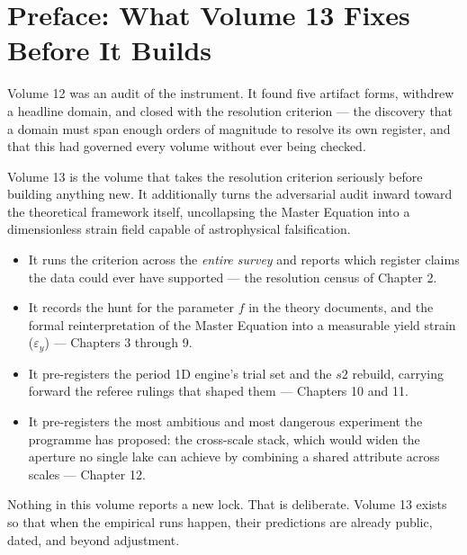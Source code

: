 \documentclass[11pt, letterpaper, openany]{book}
\begin{document}
\tableofcontents
\clearpage

\chapter*{Preface: What Volume 13 Fixes Before It Builds}

Volume 12 was an audit of the instrument. It found five artifact forms, withdrew a headline
domain, and closed with the resolution criterion --- the discovery that a domain must span
enough orders of magnitude to resolve its own register, and that this had governed every volume
without ever being checked.

Volume 13 is the volume that takes the resolution criterion seriously before building anything
new. It additionally turns the adversarial audit inward toward the theoretical framework itself, uncollapsing the Master Equation into a dimensionless strain field capable of astrophysical falsification.

\begin{itemize}
    \item It runs the criterion across the \emph{entire survey} and reports which register claims the data could ever have supported --- the resolution census of Chapter 2.
    \item It records the hunt for the parameter $f$ in the theory documents, and the formal reinterpretation of the Master Equation into a measurable yield strain ($\varepsilon_y$) --- Chapters 3 through 9.
    \item It pre-registers the period 1D engine's trial set and the $s2$ rebuild, carrying forward the referee rulings that shaped them --- Chapters 10 and 11.
    \item It pre-registers the most ambitious and most dangerous experiment the programme has proposed: the cross-scale stack, which would widen the aperture no single lake can achieve by combining a shared attribute across scales --- Chapter 12.
\end{itemize}

Nothing in this volume reports a new lock. That is deliberate. Volume 13 exists so that when the empirical runs happen, their predictions are already public, dated, and beyond adjustment.
\end{document}
